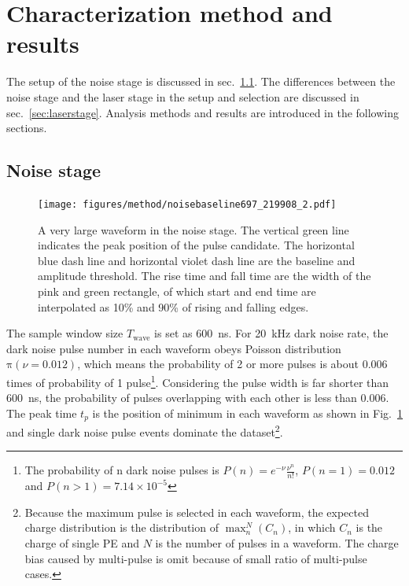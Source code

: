 \section{Characterization method and results}
\label{Method}
The setup of the noise stage is discussed in sec.~\ref{sec:noisestage}. The differences between the noise stage and the laser stage in the setup and selection are discussed in sec.~\ref{sec:laserstage}. Analysis methods and results are introduced in the following sections.
\subsection{Noise stage}
\label{sec:noisestage}
\begin{figure}[!htbp]
    \centering
    \texttt{[image: figures/method/noisebaseline697\_219908\_2.pdf]}
    \caption{A very large waveform in the noise stage. The vertical green line indicates the peak position of the pulse candidate. The horizontal blue dash line and horizontal violet dash line are the baseline and amplitude threshold. The rise time and fall time are the width of the pink and green rectangle, of which start and end time are interpolated as 10\% and 90\% of rising and falling edges.}
    \label{fig:baseline1}
\end{figure}

The sample window size $T_{\mathrm{wave}}$ is set as \SI{600}{ns}. For \SI{20}{kHz} dark noise rate, the dark noise pulse number in each waveform obeys Poisson distribution $\mathrm{\pi}(\nu=0.012)$, which means the probability of 2 or more pulses is about 0.006 times of probability of 1 pulse\footnote{The probability of n dark noise pulses is $P(n)=e^{-\nu}\frac{\nu^n}{n!}$, $P(n=1)=0.012$ and $P(n>1)=7.14\times10^{-5}$}. Considering the pulse width is far shorter than \SI{600}{ns}, the probability of pulses overlapping with each other is less than 0.006. The peak time $t_p$ is the position of minimum in each waveform as shown in Fig.~\ref{fig:baseline1} and single dark noise pulse events dominate the dataset\footnote{Because the maximum pulse is selected in each waveform, the expected charge distribution is the distribution of $\max_n^N(C_n)$, in which $C_n$ is the charge of single PE and $N$ is the number of pulses in a waveform. The charge bias caused by multi-pulse is omit because of small ratio of multi-pulse cases.}.

